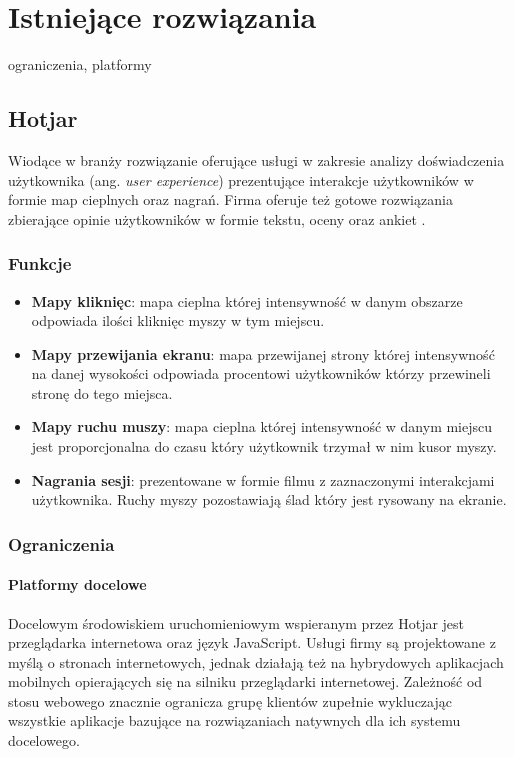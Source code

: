 \section{Istniejące rozwiązania}
ograniczenia, platformy

\subsection{Hotjar}
Wiodące w branży rozwiązanie oferujące usługi w zakresie analizy doświadczenia użytkownika (ang. {\it user experience}) prezentujące interakcje użytkowników w formie map cieplnych oraz nagrań. Firma oferuje też gotowe rozwiązania zbierające opinie użytkowników w formie tekstu, oceny oraz ankiet \cite{Hotjar_website}.

\subsubsection{Funkcje}

\begin{itemize}
	\item {\bf Mapy kliknięc}: mapa cieplna której intensywność w danym obszarze odpowiada ilości kliknięc myszy w tym miejscu.
	\item {\bf Mapy przewijania ekranu}: mapa przewijanej strony której intensywność na danej wysokości odpowiada procentowi użytkowników którzy przewineli stronę do tego miejsca.
	\item {\bf Mapy ruchu muszy}: mapa cieplna której intensywność w danym miejscu jest proporcjonalna do czasu który użytkownik trzymał w nim kusor myszy.
	\item {\bf Nagrania sesji}: prezentowane w formie filmu z zaznaczonymi interakcjami użytkownika. Ruchy myszy pozostawiają ślad który jest rysowany na ekranie.
\end{itemize}

\subsubsection{Ograniczenia} 

\paragraph{Platformy docelowe} 
Docelowym środowiskiem uruchomieniowym wspieranym przez Hotjar jest przeglądarka internetowa oraz język JavaScript. Usługi firmy są projektowane z myślą o stronach internetowych, jednak działają też na hybrydowych aplikacjach mobilnych opierających się na silniku przeglądarki internetowej. Zależność od stosu webowego znacznie ogranicza grupę klientów zupełnie wykluczając wszystkie aplikacje bazujące na rozwiązaniach natywnych dla ich systemu docelowego.


